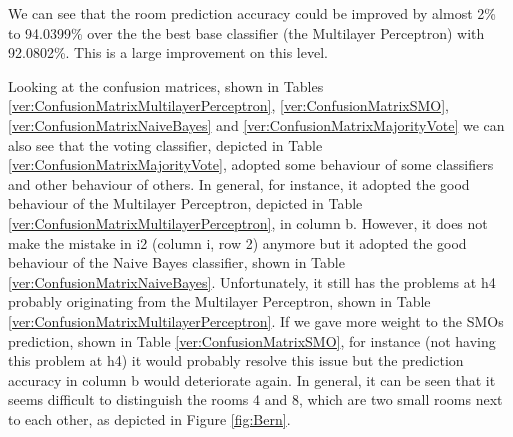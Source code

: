 We can see that the room prediction accuracy could be improved by almost 2\% to 94.0399\% over the the best base classifier (the Multilayer Perceptron) with 92.0802\%. This is a large improvement on this level.

Looking at the confusion matrices, shown in Tables \ref{ver:ConfusionMatrixMultilayerPerceptron}, \ref{ver:ConfusionMatrixSMO}, \ref{ver:ConfusionMatrixNaiveBayes} and \ref{ver:ConfusionMatrixMajorityVote} we can also see that the voting classifier, depicted in Table \ref{ver:ConfusionMatrixMajorityVote}, adopted some behaviour of some classifiers and other behaviour of others. In general, for instance, it adopted the good behaviour of the Multilayer Perceptron, depicted in Table \ref{ver:ConfusionMatrixMultilayerPerceptron}, in column b. However, it does not make the mistake in i2 (column i, row 2) anymore but it adopted the good behaviour of the Naive Bayes classifier, shown in Table \ref{ver:ConfusionMatrixNaiveBayes}. Unfortunately, it still has the problems at h4 probably originating from the Multilayer Perceptron, shown in Table \ref{ver:ConfusionMatrixMultilayerPerceptron}. If we gave more weight to the SMOs prediction, shown in Table \ref{ver:ConfusionMatrixSMO}, for instance (not having this problem at h4) it would probably resolve this issue but the prediction accuracy in column b would deteriorate again. In general, it can be seen that it seems difficult to distinguish the rooms 4 and 8, which are two small rooms next to each other, as depicted in Figure \ref{fig:Bern}.




